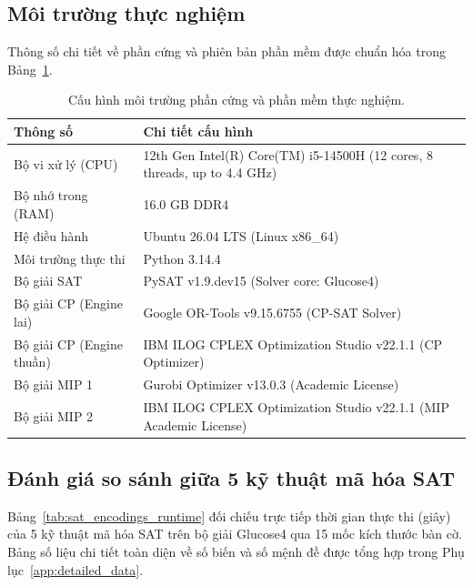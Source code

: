 \documentclass[a4paper,fleqn]{cas-sc}
\begin{document}
\subsection{Môi trường thực nghiệm}
\label{subsec:exp_env}
Thông số chi tiết về phần cứng và phiên bản phần mềm được chuẩn hóa trong Bảng~\ref{tab:env_config}.

\begin{table}[pos=htbp]
\centering
\caption{Cấu hình môi trường phần cứng và phần mềm thực nghiệm.}
\label{tab:env_config}
\begin{tabularx}{\textwidth}{>{\raggedright\arraybackslash}p{4.8cm} X}
\toprule
\textbf{Thông số} & \textbf{Chi tiết cấu hình} \\
\midrule
Bộ vi xử lý (CPU) & 12th Gen Intel(R) Core(TM) i5-14500H (12 cores, 8 threads, up to 4.4 GHz) \\
Bộ nhớ trong (RAM) & 16.0 GB DDR4 \\
Hệ điều hành & Ubuntu 26.04 LTS (Linux x86\_64) \\
Môi trường thực thi & Python 3.14.4 \\
Bộ giải SAT & PySAT v1.9.dev15 (Solver core: Glucose4) \\
Bộ giải CP (Engine lai) & Google OR-Tools v9.15.6755 (CP-SAT Solver) \\
Bộ giải CP (Engine thuần) & IBM ILOG CPLEX Optimization Studio v22.1.1 (CP Optimizer) \\
Bộ giải MIP 1 & Gurobi Optimizer v13.0.3 (Academic License) \\
Bộ giải MIP 2 & IBM ILOG CPLEX Optimization Studio v22.1.1 (MIP Academic License) \\
\bottomrule
\end{tabularx}
\end{table}

\subsection{Đánh giá so sánh giữa 5 kỹ thuật mã hóa SAT}
\label{subsec:sat_enc_results}
Bảng~\ref{tab:sat_encodings_runtime} đối chiếu trực tiếp thời gian thực thi (giây) của 5 kỹ thuật mã hóa SAT trên bộ giải Glucose4 qua 15 mốc kích thước bàn cờ. Bảng số liệu chi tiết toàn diện về số biến và số mệnh đề được tổng hợp trong Phụ lục~\ref{app:detailed_data}.
\end{document}
